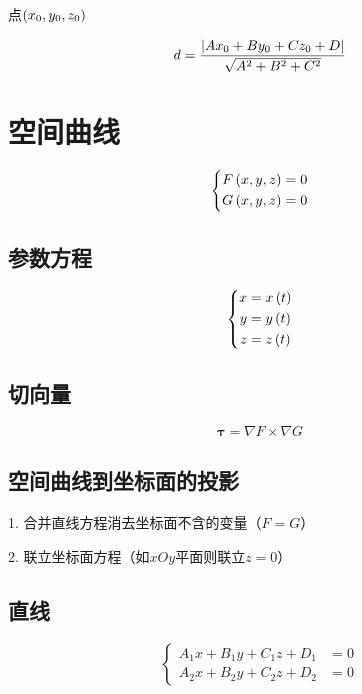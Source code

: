 \documentclass{article}
\begin{document}
点$\left(x_0,y_0,z_0\right)$

\[d=\frac{\left|Ax_0+By_0+Cz_0+D\right|}{\sqrt{A^2+B^2+C^2}}\]

\section{空间曲线}

\begin{definition}[]
    \[\left\{\begin{aligned}
            F\left(x,y,z\right) & =0 \\
            G\left(x,y,z\right) & =0
        \end{aligned}\right.\]
\end{definition}

\subsection{参数方程}

\[\left\{\begin{aligned}
        x & =x\left(t\right) \\
        y & =y\left(t\right) \\
        z & =z\left(t\right)
    \end{aligned}\right.\]

\subsection{切向量}

\[\boldsymbol\tau=\nabla F\times\nabla G\]

\subsection{空间曲线到坐标面的投影}

1. 合并直线方程消去坐标面不含的变量（$F=G$）

2. 联立坐标面方程（如$xOy$平面则联立$z=0$）

\subsection{直线}

\begin{definition}[]
    \[\left\{\begin{aligned}
            A_1x+B_1y+C_1z+D_1 & =0 \\
            A_2x+B_2y+C_2z+D_2 & =0
        \end{aligned}\right.\]
\end{definition}
\end{document}

